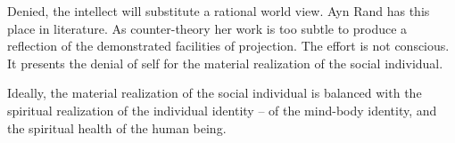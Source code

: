 Denied, the intellect will substitute a rational world view.  Ayn Rand
has this place in literature.  As counter-theory her work is too
subtle to produce a reflection of the demonstrated facilities of
projection.  The effort is not conscious.  It presents the denial of
self for the material realization of the social individual.  

Ideally, the material realization of the social individual is balanced
with the spiritual realization of the individual identity -- of the
mind-body identity, and the spiritual health of the human being.




\vfill
\bye
